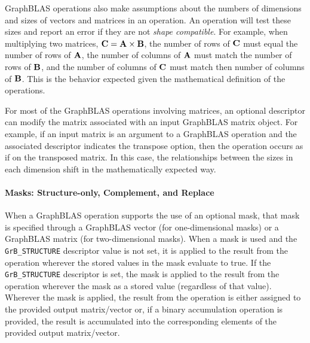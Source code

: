 GraphBLAS operations also make assumptions about the numbers of dimensions and 
sizes of vectors and matrices in an operation.   An operation will test these 
sizes and report an error if they are not \emph{shape compatible}.  For example, when multiplying 
two matrices, ${\bf C} = {\bf A} \times {\bf B}$, the number of rows of 
${\bf C}$ must equal the number of rows of ${\bf A}$, the number of columns 
of ${\bf A}$ must match the number of rows of ${\bf B}$, and the number of 
columns of ${\bf C}$ must match then number of columns of ${\bf B}$.  This 
is the behavior expected given the mathematical definition of the operations.   

For most of the GraphBLAS operations involving matrices, an optional descriptor 
can modify the matrix associated with an input GraphBLAS matrix object.  For 
example, if an input matrix is an argument to a GraphBLAS operation and the 
associated descriptor indicates the transpose option, then the operation occurs 
as if on the transposed matrix.  In this case, the relationships between the 
sizes in each dimension shift in the mathematically expected way. 

\paragraph{Masks: Structure-only, Complement, and Replace}

When a GraphBLAS operation supports the use of an optional mask, that mask is
specified through a GraphBLAS vector (for one-dimensional masks) or
a GraphBLAS matrix (for two-dimensional masks).  When a mask is used and the 
{\tt GrB\_STRUCTURE} descriptor value is not set, it is applied to the result 
from the operation wherever the stored values in the mask evaluate to true.  If
the {\tt GrB\_STRUCTURE} descriptor is set, the mask is applied to the result
from the operation wherever the mask as a stored value (regardless of that value).
Wherever the mask is applied, the result from the operation is either assigned 
to the provided output matrix/vector or, if a binary accumulation operation is 
provided, the result is accumulated into the corresponding elements of the provided 
output matrix/vector. 

